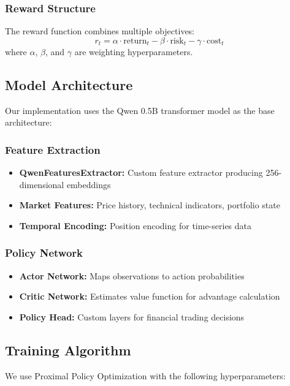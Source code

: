 \documentclass[10pt,journal]{IEEEtran}
\begin{document}
\subsubsection{Reward Structure}
The reward function combines multiple objectives:
\begin{equation}
r_t = \alpha \cdot \text{return}_t - \beta \cdot \text{risk}_t - \gamma \cdot \text{cost}_t
\end{equation}
where $\alpha$, $\beta$, and $\gamma$ are weighting hyperparameters.

\subsection{Model Architecture}
Our implementation uses the Qwen 0.5B transformer model as the base architecture:

\subsubsection{Feature Extraction}
\begin{itemize}
\item \textbf{QwenFeaturesExtractor:} Custom feature extractor producing 256-dimensional embeddings
\item \textbf{Market Features:} Price history, technical indicators, portfolio state
\item \textbf{Temporal Encoding:} Position encoding for time-series data
\end{itemize}

\subsubsection{Policy Network}
\begin{itemize}
\item \textbf{Actor Network:} Maps observations to action probabilities
\item \textbf{Critic Network:} Estimates value function for advantage calculation
\item \textbf{Policy Head:} Custom layers for financial trading decisions
\end{itemize}

\subsection{Training Algorithm}
We use Proximal Policy Optimization with the following hyperparameters:
\end{document}
